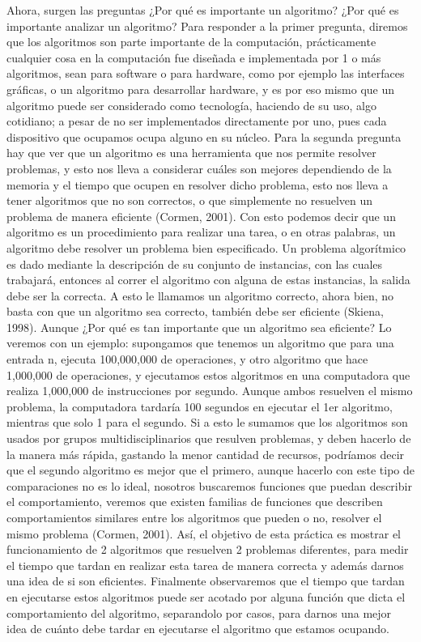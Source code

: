 \documentclass[12pt,twoside]{article}
\begin{document}
Ahora, surgen las preguntas ¿Por qu\'e es importante un algoritmo? ¿Por qu\'e es importante analizar un algoritmo? Para responder a la primer pregunta, diremos que los algoritmos son parte importante de la computaci\'on, pr\'acticamente cualquier cosa en la computaci\'on fue diseñada e implementada por 1 o m\'as algoritmos, sean para software o para hardware, como por ejemplo las interfaces gr\'aficas, o un algoritmo para desarrollar hardware, y es por eso mismo que un algoritmo puede ser considerado como tecnolog\'ia, 
haciendo de su uso, algo cotidiano; a pesar de no ser implementados directamente por uno, pues cada dispositivo que ocupamos ocupa alguno en su n\'ucleo.
Para la segunda pregunta hay que ver que un algoritmo es una herramienta que nos permite resolver problemas, y esto nos lleva a considerar cu\'ales son mejores dependiendo de la memoria y el tiempo que ocupen en resolver dicho problema, esto nos lleva a tener algoritmos que no son correctos, o que simplemente no resuelven un problema de manera eficiente (Cormen, 2001).
\newline
Con esto podemos decir que un algoritmo es un procedimiento para realizar una tarea, o en otras palabras, un algoritmo debe resolver un problema bien especificado. Un problema algor\'itmico es dado mediante la descripci\'on de su conjunto de instancias, con las cuales trabajar\'a, entonces al correr el algoritmo con alguna de estas instancias, la salida debe ser la correcta. A esto le llamamos un algoritmo correcto, ahora bien, no basta con que un algoritmo sea correcto, tambi\'en debe ser eficiente (Skiena, 1998). Aunque ¿Por qu\'e es tan importante que un algoritmo sea eficiente? 
Lo veremos con un ejemplo: supongamos que tenemos un algoritmo que para una entrada n, ejecuta 100,000,000 de operaciones, y otro algoritmo que hace 1,000,000 de operaciones, y ejecutamos estos algoritmos en una computadora que realiza 1,000,000 de instrucciones por segundo. Aunque ambos resuelven el mismo problema, la computadora tardar\'ia 100 segundos en ejecutar el 1er algoritmo, mientras que solo 1 para el segundo. Si a esto le sumamos que los algoritmos son usados por grupos multidisciplinarios que resulven problemas, y deben hacerlo de la manera m\'as r\'apida, gastando la menor cantidad de recursos, podr\'iamos decir que
el segundo algoritmo es mejor que el primero, aunque hacerlo con este tipo de comparaciones no es lo ideal, nosotros buscaremos funciones que puedan describir el comportamiento, veremos que existen familias de funciones que describen comportamientos similares entre los algoritmos que pueden o no, resolver el mismo problema (Cormen, 2001).
\newline
As\'i, el objetivo de esta pr\'actica es mostrar el funcionamiento de 2 algoritmos que resuelven 2 problemas diferentes, para medir el tiempo que tardan en realizar esta tarea de manera correcta y adem\'as darnos una idea de si son eficientes. Finalmente observaremos que el tiempo que tardan en ejecutarse estos algoritmos puede ser acotado por alguna funci\'on que dicta el comportamiento del algoritmo, separandolo por casos, para darnos una mejor idea de cu\'anto debe tardar en ejecutarse el algoritmo que estamos ocupando.
\end{document}
